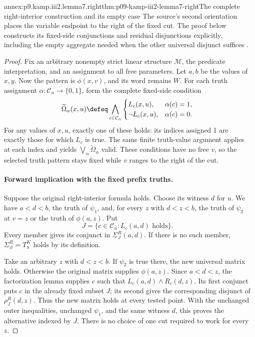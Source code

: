\begin{annexitem}{annex:p9.kamp.iii2.lemma7.right}{thm:p09-kamp-iii2-lemma7-right}{The complete right-interior construction and its empty case}
The source's second orientation places the variable endpoint to the
right of the fixed cut. The proof below constructs its fixed-side
conjunctions and residual disjunctions explicitly, including the
empty aggregate needed when the other universal disjunct suffices
\cite[ch.~III, lemma~7(b), p.~81]{Kamp1968}.

\begin{proof}
Fix an arbitrary nonempty strict linear structure \(\mathcal M\),
the predicate interpretation, and an assignment to all free parameters.
Let \(a,b\) be the values of \(x,y\). Now the pattern is
\(\phi(x,v)\), and its word remains \(W\).
For each truth assignment \(\alpha:\mathcal C_n\to\{0,1\}\),
form the complete fixed-side condition
\[
 \widetilde\Omega_\alpha(x,u)\defeq
 \bigwedge_{c\in\mathcal C_n}
 \begin{cases}
 L_c(x,u),&\alpha(c)=1,\\
 \neg L_c(x,u),&\alpha(c)=0.
 \end{cases}
\]
For any values of \(x,u\), exactly one of these holds: its
indices assigned 1 are exactly those for which \(L_c\) is true.
The same finite truth-value argument applies at each index and yields
\(\bigvee_\alpha\widetilde\Omega_\alpha\) valid.
These conditions have no free \(v\), so the selected truth
pattern stays fixed while \(v\) ranges to the right of the cut.

\paragraph{Forward implication with the fixed prefix truths.}
Suppose the original right-interior formula holds. Choose its witness
\(d\) for \(u\). We have \(a<d<b\), the truth of
\(\psi_1\), and, for every \(z\) with \(d<z<b\),
the truth of \(\psi_2\) at \(v=z\) or the truth of
\(\phi(a,z)\). Put
\[
                    J=\{c\in\mathcal C_n:L_c(a,d)\text{ holds}\}.
\]
Every member gives its conjunct in \(\Sigma_J^R(a,d)\).
If there is no such member, \(\Sigma_\varnothing^R=T^K_u\)
holds by its definition.

Take an arbitrary \(z\) with \(d<z<b\). If \(\psi_2\)
is true there, the new universal matrix holds. Otherwise the original
matrix supplies \(\phi(a,z)\). Since \(a<d<z\), the
factorization lemma supplies \(c\) such that
\(L_c(a,d)\land R_c(d,z)\). Its first conjunct puts \(c\)
in the already fixed subset \(J\); its second gives the
corresponding disjunct of \(\rho_J^R(d,z)\). Thus the new
matrix holds at every tested point. With the unchanged outer
inequalities, unchanged \(\psi_1\), and the same witness
\(d\), this proves the alternative indexed by \(J\).
There is no choice of one cut required to work for every \(z\).


\end{proof}
\end{annexitem}
